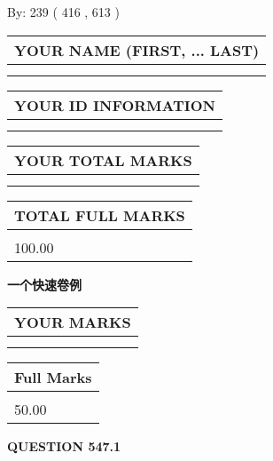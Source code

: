 \documentclass{ctexart}
\begin{document}
   
\hspace{1.0in} By: 
 239 ( 416 ,  613 )
   
   
   
   
\newpage 
\setcounter{page}{ 
   547001 } 
   
   
   
   
\noindent\begin{tabular}{|l|}
\hline
YOUR NAME (FIRST, ... LAST)  \\
\hline
 \\ 
 \\ 
\hline
\end{tabular}
\hspace{0.05in} \begin{tabular}{|l|}
\hline
 YOUR   ID   INFORMATION  \\
\hline
 \\ 
 \\ 
\hline
\end{tabular}
   
   
\vspace{0.2in}\noindent\begin{tabular}{|l|}
\hline
YOUR TOTAL MARKS  \\
\hline
 \\ 
 \\ 
\hline
\end{tabular}
\hspace{0.05in} \begin{tabular}{|l|}
\hline
TOTAL FULL MARKS  \\
\hline
 \\ 
100.00 \\
\hline
\end{tabular}
   
   
 \vspace{0.2in}
{\LARGE {\textbf{ 一个快速卷例}}}
   
   
  
\vspace{0.2in}
  
\noindent\begin{tabular}{|l|}
\hline
 YOUR MARKS  \\
\hline
 \\ 
 \\ 
\hline
\end{tabular}
\hspace{0.05in} \begin{tabular}{|l|}
\hline
 Full Marks  \\
\hline
 \\ 
50.00 \\
\hline
\end{tabular}
{\textbf{\Large{QUESTION
547.1 
}}}
  
\end{document}

